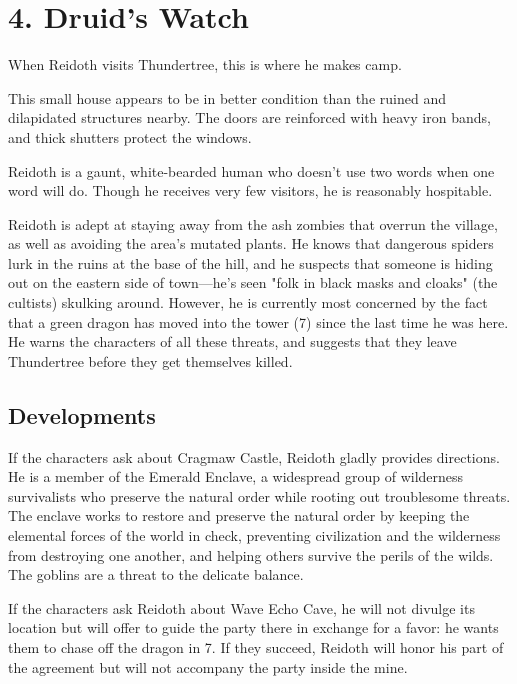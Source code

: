 \documentclass[10pt,a4paper,twoside,bg=print,twocolumn,openany,nodeprecatedcode]{dndbook}
\begin{document}
\section{4. Druid's Watch}
When Reidoth visits Thundertree, this is where he makes camp.

\begin{DndReadAloud}{}
This small house appears to be in better condition than the ruined and dilapidated structures nearby. The doors are reinforced with heavy iron bands, and thick shutters protect the windows.

Reidoth is a gaunt, white-bearded human who doesn't use two words when one word will do. Though he receives very few visitors, he is reasonably hospitable.

\end{DndReadAloud}

Reidoth is adept at staying away from the ash zombies that overrun the village, as well as avoiding the area's mutated plants. He knows that dangerous spiders lurk in the ruins at the base of the hill, and he suspects that someone is hiding out on the eastern side of town—he's seen "folk in black masks and cloaks" (the cultists) skulking around. However, he is currently most concerned by the fact that a green dragon has moved into the tower (7) since the last time he was here. He warns the characters of all these threats, and suggests that they leave Thundertree before they get themselves killed.

\subsection{Developments}
If the characters ask about Cragmaw Castle, Reidoth gladly provides directions. He is a member of the Emerald Enclave, a widespread group of wilderness survivalists who preserve the natural order while rooting out troublesome threats. The enclave works to restore and preserve the natural order by keeping the elemental forces of the world in check, preventing civilization and the wilderness from destroying one another, and helping others survive the perils of the wilds. The goblins are a threat to the delicate balance.

If the characters ask Reidoth about Wave Echo Cave, he will not divulge its location but will offer to guide the party there in exchange for a favor: he wants them to chase off the dragon in 7. If they succeed, Reidoth will honor his part of the agreement but will not accompany the party inside the mine.
\end{document}
